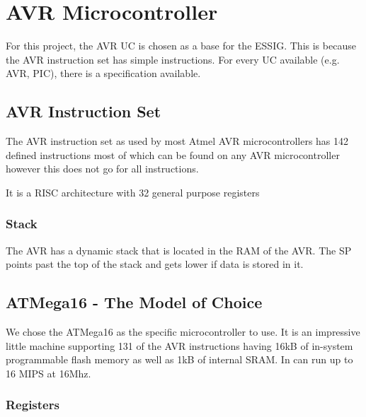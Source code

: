 \chapter{AVR Microcontroller}
For this project, the AVR \ac{UC} is chosen as a base for the \ac{ESSIG}. This
is because the AVR instruction set has simple instructions. For every \ac{UC}
available (e.g. AVR, PIC), there is a specification available.
 
%

\section{AVR Instruction Set}

The AVR instruction set as used by most Atmel AVR microcontrollers has 142 
defined instructions most of which can be found on any AVR microcontroller 
however this does not go for all instructions.

It is a RISC architecture with 32 general purpose registers 

\subsection{Stack}

The AVR has a dynamic stack that is located in the RAM of the AVR.
The \ac{SP} points past the top of the stack and gets lower if data is 
stored in it.

\section{ATMega16 - The Model of Choice}

We chose the ATMega16 as the specific microcontroller to use. It is an 
impressive little machine supporting 131 of the AVR instructions
having 16kB of in-system programmable flash memory as well as 1kB of 
internal SRAM. In can run up to 16 MIPS at 16Mhz.

\subsection{Registers}

